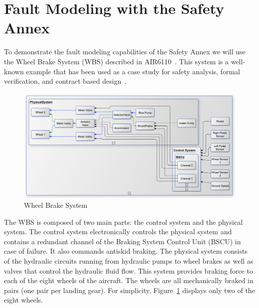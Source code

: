 \section{Fault Modeling with the Safety Annex}
\label{sec:fault_modeling}

To demonstrate the fault modeling capabilities of the Safety Annex we will use the Wheel Brake System (WBS) described in AIR6110~\cite{AIR6110}.  This system is a well-known example that has been used as a case study for safety analysis, formal verification, and contract based design~\cite{DBLP:conf/cav/BozzanoCPJKPRT15, 10.1007/978-3-319-11936-6-7, CAV2015:BoCiGrMa, Joshi05:SafeComp}. %

\begin{figure}[h!]
	\centering
	\includegraphics[trim=0 9 0 5,clip,width=\textwidth]{images/wbs_arch4_diagram.pdf}
	\caption{Wheel Brake System}
	\label{fig:wbs}
\end{figure} 

The WBS is composed of two main parts: the control system and the physical system. The control system electronically controls the physical system and contains a redundant channel of the Braking System Control Unit (BSCU) in case of failure. It also commands antiskid braking.%
The physical system consists of the hydraulic circuits running from hydraulic pumps to wheel brakes as well as valves that control the hydraulic fluid flow. This system provides braking force to each of the eight wheels of the aircraft. The wheels are all mechanically braked in pairs (one pair per landing gear). For simplicity, Figure~\ref{fig:wbs} displays only two of the eight wheels. 

